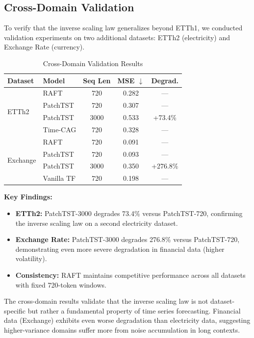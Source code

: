 \documentclass[10pt,twocolumn,letterpaper]{article}
\begin{document}
\subsection{Cross-Domain Validation}

To verify that the inverse scaling law generalizes beyond ETTh1, we conducted validation experiments on two additional datasets: ETTh2 (electricity) and Exchange Rate (currency).

\begin{table}[h]
\centering
\caption{Cross-Domain Validation Results}
\label{tab:cross_domain}
\small
\begin{tabular}{llccc}
\toprule
\textbf{Dataset} & \textbf{Model} & \textbf{Seq Len} & \textbf{MSE $\downarrow$} & \textbf{Degrad.} \\
\midrule
\multirow{4}{*}{ETTh2} 
    & RAFT & 720 & 0.282 & --- \\
    & PatchTST & 720 & 0.307 & --- \\
    & PatchTST & 3000 & 0.533 & +73.4\% \\
    & Time-CAG & 720 & 0.328 & --- \\
\midrule
\multirow{4}{*}{Exchange} 
    & RAFT & 720 & 0.091 & --- \\
    & PatchTST & 720 & 0.093 & --- \\
    & PatchTST & 3000 & 0.350 & +276.8\% \\
    & Vanilla TF & 720 & 0.198 & --- \\
\bottomrule
\end{tabular}
\end{table}

\noindent\textbf{Key Findings:}
\begin{itemize}
    \item \textbf{ETTh2:} PatchTST-3000 degrades 73.4\% versus PatchTST-720, confirming the inverse scaling law on a second electricity dataset.
    \item \textbf{Exchange Rate:} PatchTST-3000 degrades 276.8\% versus PatchTST-720, demonstrating even more severe degradation in financial data (higher volatility).
    \item \textbf{Consistency:} RAFT maintains competitive performance across all datasets with fixed 720-token windows.
\end{itemize}

The cross-domain results validate that the inverse scaling law is not dataset-specific but rather a fundamental property of time series forecasting. Financial data (Exchange) exhibits even worse degradation than electricity data, suggesting higher-variance domains suffer more from noise accumulation in long contexts.
\end{document}
